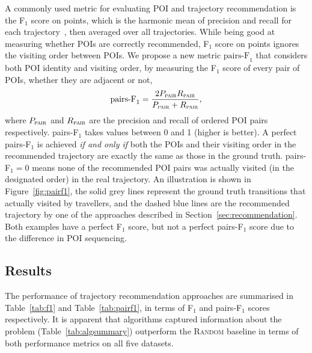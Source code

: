 A commonly used metric for evaluating POI and trajectory recommendation is
the F$_1$ score on points, which is the harmonic mean of precision and recall for each trajectory~\cite{ijcai15}, then averaged over all trajectories.
While being good at measuring whether POIs are correctly recommended,
F$_1$ score on points ignores the visiting order between POIs.
We propose a new metric $\text{pairs-F}_1$ that considers both POI identity and visiting order,
by measuring the F$_1$ score of every pair of POIs,
whether they are adjacent or not,
\eqmoveup
\begin{displaymath}
\text{pairs-F}_1 = \frac{2 P_{\textsc{pair}} R_{\textsc{pair}}}
                        {P_{\textsc{pair}} + R_{\textsc{pair}}},
\end{displaymath}
where $P_{\textsc{pair}}$ and $R_{\textsc{pair}}$ are the precision and recall of ordered POI pairs respectively. 
pairs-F$_1$ takes values between 0 and 1 (higher is better).
A perfect pairs-F$_1$ is achieved {\em if and only if}
both the POIs and their visiting order in the
recommended trajectory are exactly the same as those in the ground truth.
pairs-F$_1 = 0$ means none of the recommended POI pairs was actually visited 
(in the designated order) in the real trajectory.
An illustration is shown in Figure~\ref{fig:pairf1},
the solid grey lines represent the ground truth transitions that actually visited by travellers,
and the dashed blue lines are the recommended trajectory by one of the approaches described in Section~\ref{sec:recommendation}.
Both examples have a perfect F$_1$ score, but not a perfect pairs-F$_1$ score due to the difference in POI sequencing.


\secmoveup
\subsection{Results}
\label{sec:result}

%
%
%

The performance of trajectory recommendation approaches are summarised in
Table~\ref{tab:f1} and Table~\ref{tab:pairf1},
in terms of F$_1$ and pairs-F$_1$ scores respectively.
It is apparent that algorithms 
captured information about the problem (Table~\ref{tab:algsummary})
outperform the \textsc{Random} baseline in terms of both performance metrics on all five datasets.


